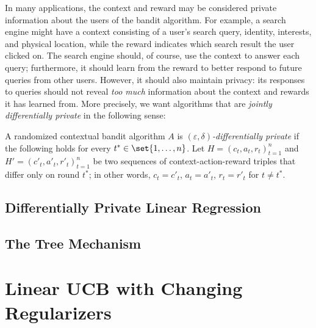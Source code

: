 \documentclass{article}
\begin{document}
In many applications, the context and reward may be considered private
information about the users of the bandit algorithm.  For example, a
search engine might have a context consisting of a user's search
query, identity, interests, and physical location, while the reward
indicates which search result the user clicked on.  The search engine
should, of course, use the context to answer each query; furthermore,
it should learn from the reward to better respond to future queries
from other users.  However, it should also maintain privacy: its
responses to queries should not reveal \emph{too much} information
about the context and rewards it has learned from.  More precisely, we
want algorithms that are \emph{jointly differentially private} in the
following sense:

\begin{definition}
  A randomized contextual bandit algorithm $A$ is
  \emph{$(\varepsilon,\delta)$-differentially private} if the
  following holds for every $t^*\in\set{1,\dotsc,n}$.  Let
  $H = (c_t,a_t,r_t)_{t=1}^n$ and $H' = (c'_t,a'_t,r'_t)_{t=1}^n$ be
  two sequences of context-action-reward triples that differ only on
  round $t^*$; in other words, $c_t=c'_t$, $a_t=a'_t$, $r_t=r'_t$ for
  $t\neq t^*$.  
\end{definition}


\subsection{Differentially Private Linear Regression}
\label{sec:dp-regression}

\subsection{The Tree Mechanism}
\label{sec:tree-mechanism}

\section{Linear UCB with Changing Regularizers}

\end{document}
